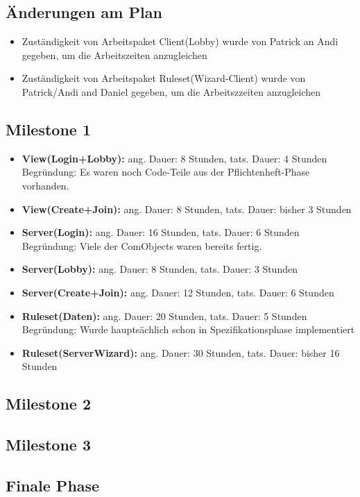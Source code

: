 \documentclass{article}
\begin{document}
\subsection{Änderungen am Plan}
\begin{itemize}
\item Zuständigkeit von Arbeitspaket Client(Lobby) wurde von Patrick an Andi gegeben, um die Arbeitszeiten anzugleichen
\item Zuständigkeit von Arbeitspaket Ruleset(Wizard-Client) wurde von Patrick/Andi and Daniel gegeben, um die Arbeitszzeiten anzugleichen
\end{itemize}

\subsection{Milestone 1}

\begin{itemize}
\item \textbf{View(Login+Lobby):} ang. Dauer: 8 Stunden, tats. Dauer: 4 Stunden \\
Begründung: Es waren noch Code-Teile aus der Pflichtenheft-Phase vorhanden.
\item \textbf{View(Create+Join):} ang. Dauer: 8 Stunden, tats. Dauer: bisher 3 Stunden
\item \textbf{Server(Login):} ang. Dauer: 16 Stunden, tats. Dauer: 6 Stunden \\
Begründung: Viele der ComObjects waren bereits fertig.
\item \textbf{Server(Lobby):} ang. Dauer: 8 Stunden, tats. Dauer: 3 Stunden 
\item \textbf{Server(Create+Join):} ang. Dauer: 12 Stunden, tats. Dauer: 6 Stunden 
\item \textbf{Ruleset(Daten):} ang. Dauer: 20 Stunden, tats. Dauer: 5 Stunden
Begründung: Wurde hauptsächlich schon in Spezifikationsphase implementiert

\item \textbf{Ruleset(ServerWizard):} ang. Dauer: 30 Stunden, tats. Dauer: bisher 16 Stunden

\end{itemize}

\subsection{Milestone 2}

\subsection{Milestone 3}

\subsection{Finale Phase}
\end{document}
